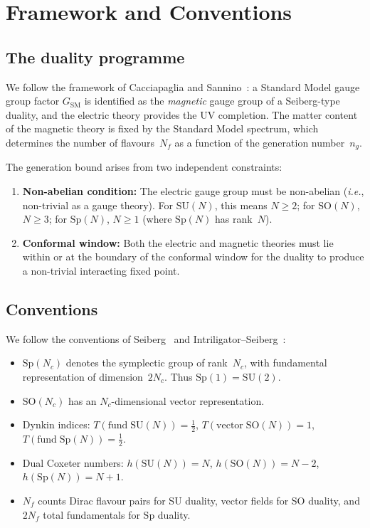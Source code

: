 \documentclass[11pt,a4paper]{article}
\theoremstyle{plain}
\theoremstyle{definition}
\theoremstyle{remark}
\newcommand{\Nc}{N_{\!c}}
\newcommand{\Nf}{N_{\!f}}
\newcommand{\ngen}{n_g}
\newcommand{\SU}[1]{\mathrm{SU}(#1)}
\newcommand{\SO}[1]{\mathrm{SO}(#1)}
\newcommand{\Sp}[1]{\mathrm{Sp}(#1)}
\newcommand{\ie}{\textit{i.e.}}
\newcommand{\SM}{\ensuremath{\mathrm{SM}}}
\begin{document}
\section{Framework and Conventions}
\label{sec:framework}

\subsection{The duality programme}

We follow the framework of Cacciapaglia and
Sannino~\cite{CacciapagliaSannino2024}: a Standard Model gauge group
factor $G_{\SM}$ is identified as the \emph{magnetic} gauge group of a
Seiberg-type duality, and the electric theory provides the UV completion.
The matter content of the magnetic theory is fixed by the Standard Model
spectrum, which determines the number of flavours~$\Nf$ as a function
of the generation number~$\ngen$.

The generation bound arises from two independent constraints:
\begin{enumerate}
  \item \textbf{Non-abelian condition:} The electric gauge group must be
    non-abelian (\ie, non-trivial as a gauge theory).  For $\SU{N}$,
    this means $N \geq 2$; for $\SO{N}$, $N \geq 3$; for $\Sp{N}$,
    $N \geq 1$ (where $\Sp{N}$ has rank~$N$).
  \item \textbf{Conformal window:} Both the electric and magnetic
    theories must lie within or at the boundary of the conformal window
    for the duality to produce a non-trivial interacting fixed point.
\end{enumerate}

\subsection{Conventions}

We follow the conventions of Seiberg~\cite{Seiberg1995} and
Intriligator--Seiberg~\cite{IS9506101,IS1995}:
\begin{itemize}
  \item $\Sp{\Nc}$ denotes the symplectic group of rank~$\Nc$, with
    fundamental representation of dimension~$2\Nc$.  Thus
    $\Sp{1} = \SU{2}$.
  \item $\SO{\Nc}$ has an $\Nc$-dimensional vector representation.
  \item Dynkin indices: $T(\mathrm{fund}\;\SU{N}) = \tfrac{1}{2}$,
    $T(\mathrm{vector}\;\SO{N}) = 1$,
    $T(\mathrm{fund}\;\Sp{N}) = \tfrac{1}{2}$.
  \item Dual Coxeter numbers: $h(\SU{N}) = N$, $h(\SO{N}) = N - 2$,
    $h(\Sp{N}) = N + 1$.
  \item $\Nf$ counts Dirac flavour pairs for SU duality, vector fields
    for SO duality, and $2\Nf$ total fundamentals for Sp duality.
\end{itemize}
\end{document}
